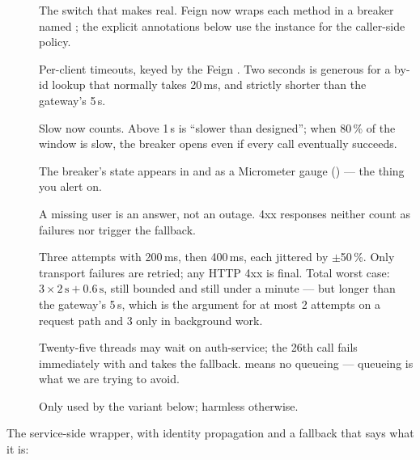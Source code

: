 \begin{description}
  \item[] The switch that makes  real. Feign
  now wraps each method in a breaker named
  ; the explicit annotations
  below use the  instance for the caller-side policy.
  \item[] Per-client timeouts, keyed by the Feign .
  Two seconds is generous for a by-id lookup that normally takes
  20\,ms, and strictly shorter than the gateway's 5\,s.
  \item[] Slow now counts. Above 1\,s is ``slower than designed'';
  when 80\,\% of the window is slow, the breaker opens even if every
  call eventually succeeds.
  \item[] The breaker's state appears in 
  and as a Micrometer gauge () --- the thing
  you alert on.
  \item[] A missing user is an answer, not an outage. 4xx
  responses neither count as failures nor trigger the fallback.
  \item[] Three attempts with 200\,ms, then 400\,ms, each
  jittered by $\pm$50\,\%. Only transport failures are retried; any
  HTTP 4xx is final. Total worst case: $3 \times 2\,\text{s} + 0.6\,\text{s}$,
  still bounded and still under a minute --- but longer than the
  gateway's 5\,s, which is the argument for at most 2 attempts on a
  request path and 3 only in background work.
  \item[] Twenty-five threads may wait on auth-service; the 26th
  call fails immediately with  and takes the
  fallback.  means no queueing --- queueing
  is what we are trying to avoid.
  \item[] Only used by the  variant
  below; harmless otherwise.
\end{description}

The service-side wrapper, with identity propagation and a fallback that
says what it is:

